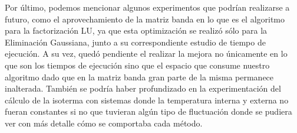 Por último, podemos mencionar algunos experimentos que podrían realizarse a
futuro, como el aprovechamiento de la matriz banda en lo que es el algoritmo
para la factorización LU, ya que esta optimización se realizó sólo para la
Eliminación Gaussiana, junto a su correspondiente estudio de tiempo de
ejecución. A su vez, quedó pendiente el realizar la mejora no únicamente en lo
que son los tiempos de ejecución sino que el espacio que consume nuestro
algoritmo dado que en la matriz banda gran parte de la misma permanece
inalterada. También se podría haber profundizado en la experimentación del
cálculo de la isoterma con sistemas donde la temperatura interna y externa no
fueran constantes si no que tuvieran algún tipo de fluctuación donde se pudiera
ver con más detalle cómo se comportaba cada método.
